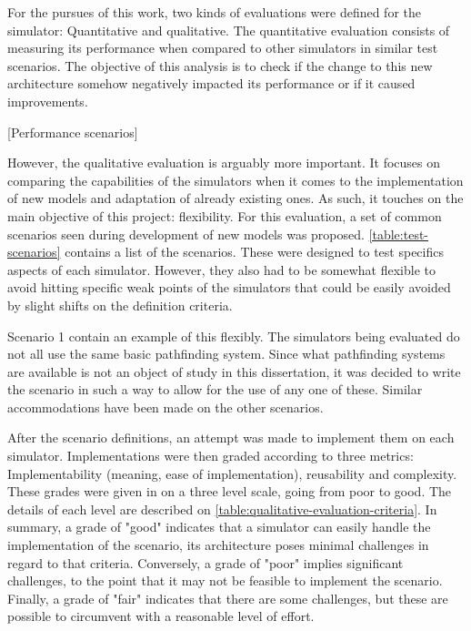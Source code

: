 \documentclass[twoside, 11pt]{article}
\begin{document}
For the pursues of this work, two kinds of evaluations were defined for the simulator: Quantitative and qualitative. The quantitative evaluation consists of measuring its performance when compared to other simulators in similar test scenarios. The objective of this analysis is to check if the change to this new architecture somehow negatively impacted its performance or if it caused improvements.

[Performance scenarios]

However, the qualitative evaluation is arguably more important. It focuses on comparing the capabilities of the simulators when it comes to the implementation of new models and adaptation of already existing ones. As such, it touches on the main objective of this project: flexibility. For this evaluation, a set of common scenarios seen during development of new models was proposed. \autoref{table:test-scenarios} contains a list of the scenarios. These were designed to test specifics aspects of each simulator. However, they also had to be somewhat flexible to avoid hitting specific weak points of the simulators that could be easily avoided by slight shifts on the definition criteria. 

Scenario 1 contain an example of this flexibly. The simulators being evaluated do not all use the same basic pathfinding system. Since what pathfinding systems are available is not an object of study in this dissertation, it was decided to write the scenario in such a way to allow for the use of any one of these. Similar accommodations have been made on the other scenarios. 

After the scenario definitions, an attempt was made to implement them on each simulator. Implementations were then graded according to three metrics: Implementability (meaning, ease of implementation), reusability and complexity. These grades were given in on a three level scale, going from poor to good. The details of each level are described on \autoref{table:qualitative-evaluation-criteria}. In summary, a grade of "good" indicates that a simulator can easily handle the implementation of the scenario, its architecture poses minimal challenges in regard to that criteria. Conversely, a grade of "poor" implies significant challenges, to the point that it may not be feasible to implement the scenario. Finally, a grade of "fair" indicates that there are some challenges, but these are possible to circumvent with a reasonable level of effort.
\end{document}
